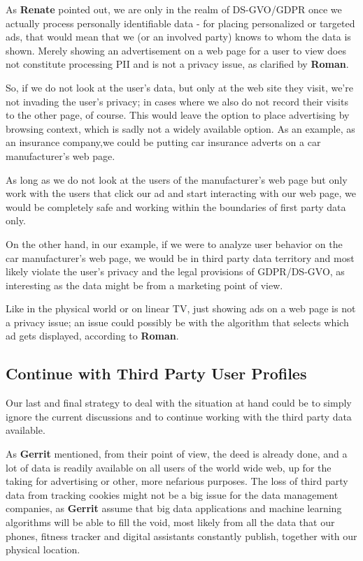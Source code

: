 As \textbf{Renate} pointed out, we are only in the realm of DS-GVO/GDPR once we actually process personally identifiable data - for placing personalized or targeted ads, that would mean that we (or an involved party) knows to whom the data is shown. Merely showing an advertisement on a web page for a user to view does not constitute processing PII and is not a privacy issue, as clarified by \textbf{Roman}.

So, if we do not look at the user's data, but only at the web site they visit, we're not invading the user's privacy; in cases where we also do not record their visits to the other page, of course. This would leave the option to place advertising by browsing context, which is sadly not a widely available option. As an example, as an insurance company,we could be putting car insurance adverts on a car manufacturer's web page. 

As long as we do not look at the users of the manufacturer's web page but only work with the users that click our ad and start interacting with our web page, we would be completely safe and working within the boundaries of first party data only.

On the other hand, in our example, if we were to analyze user behavior on the car manufacturer's web page, we would be in third party data territory and most likely violate the user's privacy and the legal provisions of GDPR/DS-GVO, as interesting as the data might be from a marketing point of view.

Like in the physical world or on linear TV, just showing ads on a web page is not a privacy issue; an issue could possibly be with the algorithm that selects which ad gets displayed, according to \textbf{Roman}.

\subsection{Continue with Third Party User Profiles}

Our last and final strategy to deal with the situation at hand could be to simply ignore the current discussions and to continue working with the third party data available.

As \textbf{Gerrit} mentioned, from their point of view, the deed is already done, and a lot of data is readily available on all users of the world wide web, up for the taking for advertising or other, more nefarious purposes. The loss of third party data from tracking cookies might not be a big issue for the data management companies, as \textbf{Gerrit} assume that big data applications and machine learning algorithms will be able to fill the void, most likely from all the data that our phones, fitness tracker and digital assistants constantly publish, together with our physical location.

